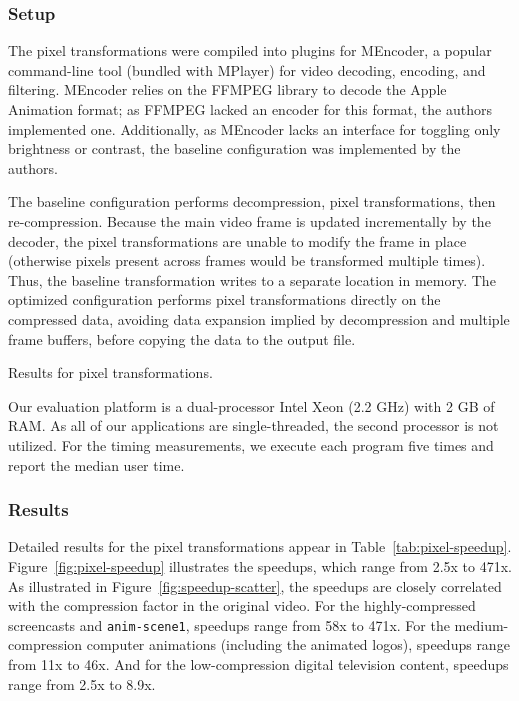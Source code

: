 \subsubsection{Setup}

The pixel transformations were compiled into plugins for MEncoder, a
popular command-line tool (bundled with MPlayer) for video decoding,
encoding, and filtering.  MEncoder relies on the FFMPEG library to
decode the Apple Animation format; as FFMPEG lacked an encoder for
this format, the authors implemented one.  Additionally, as MEncoder
lacks an interface for toggling only brightness or contrast, the
baseline configuration was implemented by the authors.

The baseline configuration performs decompression, pixel
transformations, then re-compression.  Because the main video frame is
updated incrementally by the decoder, the pixel transformations are
unable to modify the frame in place (otherwise pixels present across
frames would be transformed multiple times).  Thus, the baseline
transformation writes to a separate location in memory.  The optimized
configuration performs pixel transformations directly on the
compressed data, avoiding data expansion implied by decompression and
multiple frame buffers, before copying the data to the output file.

\begin{table*}[t]
\caption{Results for pixel transformations.
\protect\label{tab:pixel-speedup}}
\end{table*}

Our evaluation platform is a dual-processor Intel Xeon (2.2 GHz) with
2 GB of RAM.  As all of our applications are single-threaded, the
second processor is not utilized.  For the timing measurements, we
execute each program five times and report the median user time.

\subsubsection{Results}

Detailed results for the pixel transformations appear in
Table~\ref{tab:pixel-speedup}.  Figure~\ref{fig:pixel-speedup}
illustrates the speedups, which range from 2.5x to 471x.  As
illustrated in Figure~\ref{fig:speedup-scatter}, the speedups are
closely correlated with the compression factor in the original video.
For the highly-compressed screencasts and {\tt anim-scene1}, speedups
range from 58x to 471x.  For the medium-compression computer
animations (including the animated logos), speedups range from 11x to
46x.  And for the low-compression digital television content, speedups
range from 2.5x to 8.9x.


